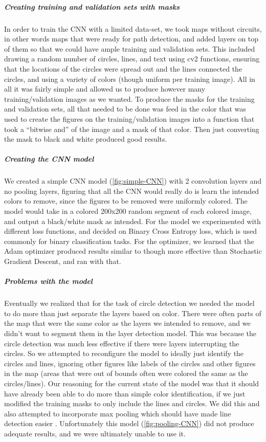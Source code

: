 \documentclass[a4paper,12pt]{extarticle}
\begin{document}
\subparagraph{Creating training and validation sets with masks\\}

In order to train the CNN with a limited data-set, we took maps without circuits, in other words maps that were ready for path detection, and added layers on top of them so that we could have ample training and validation sets. This included drawing a random number of circles, lines, and text using cv2 functions, ensuring that the locations of the circles were spread out and the lines connected the circles, and using a variety of colors (though uniform per training image). All in all it was fairly simple and allowed us to produce however many training/validation images as we wanted. To produce the masks for the training and validation sets, all that needed to be done was feed in the color that was used to create the figures on the training/validation images into a function that took a “bitwise and” of the image and a mask of that color. Then just converting the mask to black and white produced good results.

\subparagraph{Creating the CNN model\\}
We created a simple CNN model (\cref{fig:simple-CNN}) with 2 convolution layers and no pooling layers, figuring that all the CNN would really do is learn the intended colors to remove, since the figures to be removed were uniformly colored. The model would take in a colored 200x200 random segment of each colored image, and output a black/white mask as intended. For the model we experimented with different loss functions, and decided on Binary Cross Entropy loss, which is used commonly for binary classification tasks. For the optimizer, we learned that the Adam optimizer produced results similar to though more effective than Stochastic Gradient Descent, and ran with that.



\subparagraph{Problems with the model\\}
Eventually we realized that for the task of circle detection we needed the model to do more than just separate the layers based on color.
There were often parts of the map that were the same color as the layers we intended to remove, and we didn't want to segment them in the layer detection model.
This was because the circle detection was much less effective if there were layers interrupting the circles. So we attempted to reconfigure the model to ideally just identify the circles and lines, ignoring other figures like labels of the circles and other figures in the map (areas that were out of bounds often were colored the same as the circles/lines).
Our reasoning for the current state of the model was that it should have already been able to do more than simple color identification, if we just modified the training masks to only include the lines and circles. We did this and also attempted to incorporate max pooling which should have made line detection easier \cite{cnnsemanticsegmentation}. Unfortunately this model (\cref{fig:pooling-CNN}) did not produce adequate results, and we were ultimately unable to use it.
\end{document}
